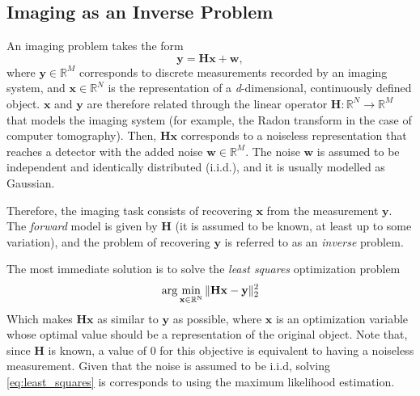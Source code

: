 
\subsection{Imaging as an Inverse Problem} \label{sect:1.imaging}

An imaging problem \cite{soubies_pocket_2019, noauthor_tutorial_2020} takes the form
\begin{equation}
    \mathbf{y} = \mathbf{Hx} + \mathbf{w}\mathrm{,}
    \label{eq:imaging_compact}
\end{equation}
where $\mathbf{y} \in \mathbb{R}^M$ corresponds to discrete measurements recorded by an imaging system, and $\mathbf{x}\in \mathbb{R}^N$ is the representation of a \textit{d}-dimensional, continuously defined object. $\mathbf{x}$ and $\mathbf{y}$ are therefore related through the linear operator $\mathbf{H}:\mathbb{R}^N\rightarrow\mathbb{R}^M$ that models the imaging system (for example, the Radon transform in the case of computer tomography). Then, $\mathbf{Hx}$ corresponds to a noiseless representation that reaches a detector with the added noise $\mathbf{w} \in \mathbb{R}^M$. The noise $\mathbf{w}$ is assumed to be independent and identically distributed (i.i.d.), and it is usually modelled as Gaussian. 

Therefore, the imaging task consists of recovering $\mathbf{x}$ from the measurement $\mathbf{y}$. The \textit{forward} model is given by $\mathbf{H}$ (it is assumed to be known, at least up to some variation), and the problem of recovering $\mathbf{y}$ is referred to as an \textit{inverse} problem. 

The most immediate solution is to solve the \textit{least squares} optimization problem
\begin{equation}
    \arg \min_{\mathbf{x}\in \rm \mathbb{R}^N}\|\mathbf{Hx} - \mathbf{y}\|^2_2
    \label{eq:least_squares}
\end{equation}
Which makes $\mathbf{Hx}$ as similar to $\mathbf{y}$ as possible, where $\mathbf{x}$ is an optimization variable whose optimal value should be a representation of the original object. Note that, since $\mathbf{H}$ is known, a value of $0$ for this objective is equivalent to having a noiseless measurement. Given that the noise is assumed to be i.i.d, solving \eqref{eq:least_squares} is corresponds to using the maximum likelihood estimation. 


